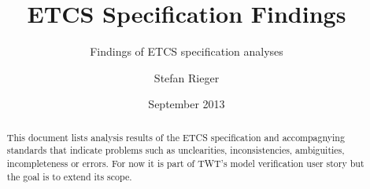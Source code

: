 \documentclass{template/openetcs_article}
\begin{document}
\frontmatter
{}







\title{ETCS Specification Findings}

\subtitle{Findings of ETCS specification analyses}

\date{September 2013}


\author{Stefan Rieger}







\begin{abstract}
  This document lists analysis results of the ETCS specification and accompagnying standards that indicate problems such as unclearities, inconsistencies, ambiguities, incompleteness or errors. For now it is part of TWT's model verification user story but the goal is to extend its scope.
\end{abstract}

\newcommand{\issue}[1]{\refstepcounter{issuecounter}\textbf{Issue \#\arabic{issuecounter} (#1):}}	

\newcommand{\resolution}{\textit{Resolution: }}	

\maketitle
\end{document}
